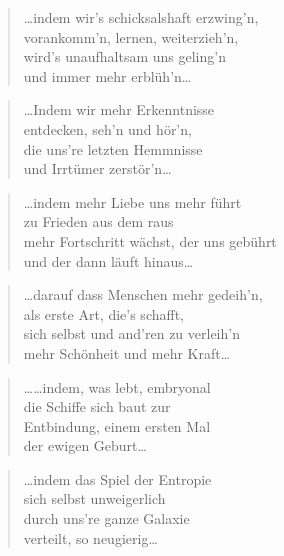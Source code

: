 \documentclass[10pt,a4paper]{article}
\begin{document}
\begin{paracol}{2}
\begin{verse}
…indem wir’s schicksalshaft erzwing’n, \\
vorankomm’n, lernen, weiterzieh’n, \\
wird’s unaufhaltsam uns geling’n \\
und immer mehr erblüh’n… \\
\end{verse}

\begin{verse}
…Indem wir mehr Erkenntnisse \\
entdecken, seh’n und hör’n, \\
die uns’re letzten Hemmnisse \\
und Irrtümer zerstör’n… \\
\end{verse}

\begin{verse}
…indem mehr Liebe uns mehr führt \\
zu Frieden aus dem raus \\
mehr Fortschritt wächst, der uns gebührt \\
und der dann läuft hinaus… \\
\end{verse}

\begin{verse}
…darauf dass Menschen mehr gedeih’n, \\
als erste Art, die’s schafft, \\
sich selbst und and’ren zu verleih’n \\
mehr Schönheit und mehr Kraft… \\
\end{verse}

\begin{verse}
……indem, was lebt, embryonal \\
die Schiffe sich baut zur \\
Entbindung, einem ersten Mal \\
der ewigen Geburt… \\
\end{verse}

\begin{verse}
…indem das Spiel der Entropie \\
sich selbst unweigerlich \\
durch uns’re ganze Galaxie \\
verteilt, so neugierig… \\
\end{verse}


\end{paracol}
\end{document}
